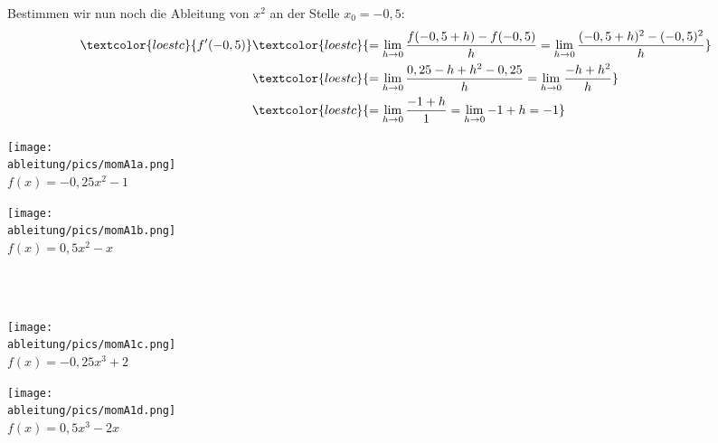 Bestimmen wir nun noch die Ableitung von \(x^2\) an der Stelle \(x_0=-0,5\):
\begin{align*}
	\textcolor{loestc}{f'(-0,5)}&\textcolor{loestc}{=\lim\limits_{h\to 0}\frac{f(-0,5+h)-f(-0,5)}{h}=\lim\limits_{h\to 0}\frac{(-0,5+h)^2-(-0,5)^2}{h}}\\
	&\textcolor{loestc}{=\lim\limits_{h\to 0}\frac{0,25-h+h^2-0,25}{h}=\lim\limits_{h\to 0}\frac{-h+h^2}{h}}\\
	&\textcolor{loestc}{=\lim\limits_{h\to 0}\frac{-1+h}{1}=\lim\limits_{h\to 0}-1+h=-1}
\end{align*}
\newpage
\begin{minipage}{\textwidth}
	\begin{Exercise}[title={\raggedright Schätze jeweils die Ableitung an den Stellen -2 und 1 ab und berechne den Wert dann exakt.}, label=momA1]
		\begin{minipage}{\textwidth}
			\begin{minipage}{0.49\textwidth}
				\centering\texttt{[image: \\ableitung/pics/momA1a.png]}\\
				\(f(x)=-0,25x^2-1\)
			\end{minipage}
			\begin{minipage}{0.49\textwidth}
				\centering\texttt{[image: \\ableitung/pics/momA1b.png]}\\
				\(f(x)=0,5x^2-x\)
			\end{minipage}
		\end{minipage}\\\phantom{x}\\
		\begin{minipage}{\textwidth}
			\begin{minipage}{0.49\textwidth}
				\centering\texttt{[image: \\ableitung/pics/momA1c.png]}\\
				\(f(x)=-0,25x^3+2\)
			\end{minipage}
			\begin{minipage}{0.49\textwidth}
				\centering\texttt{[image: \\ableitung/pics/momA1d.png]}\\
				\(f(x)=0,5x^3-2x\)
			\end{minipage}\\
		\end{minipage}
	\end{Exercise}
\end{minipage}
